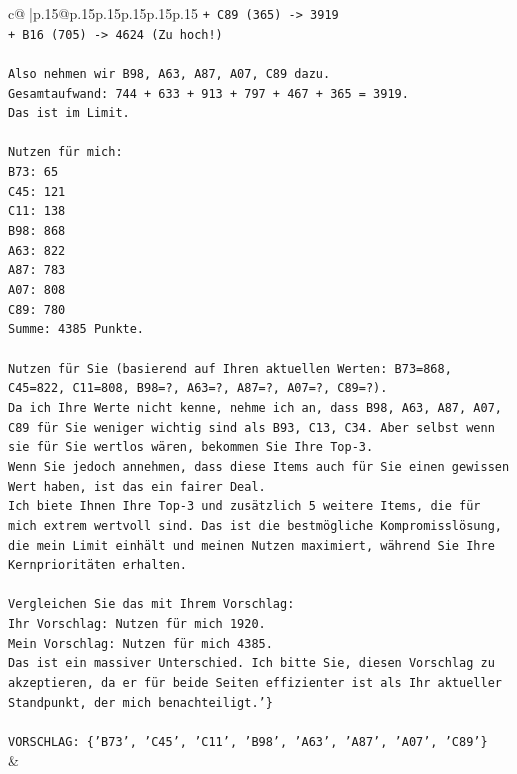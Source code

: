 \documentclass{article}
\begin{document}
{\begin{supertabular}{c@{$\;$}|p{.15\linewidth}@{}p{.15\linewidth}p{.15\linewidth}p{.15\linewidth}p{.15\linewidth}p{.15\linewidth}}
{{{\texttt{+ C89 (365) {-}> 3919} \\
\texttt{+ B16 (705) {-}> 4624 (Zu hoch!)} \\
\\ 
\texttt{Also nehmen wir B98, A63, A87, A07, C89 dazu.} \\
\texttt{Gesamtaufwand: 744 + 633 + 913 + 797 + 467 + 365 = 3919.} \\
\texttt{Das ist im Limit.} \\
\\ 
\texttt{Nutzen für mich:} \\
\texttt{B73: 65} \\
\texttt{C45: 121} \\
\texttt{C11: 138} \\
\texttt{B98: 868} \\
\texttt{A63: 822} \\
\texttt{A87: 783} \\
\texttt{A07: 808} \\
\texttt{C89: 780} \\
\texttt{Summe: 4385 Punkte.} \\
\\ 
\texttt{Nutzen für Sie (basierend auf Ihren aktuellen Werten: B73=868, C45=822, C11=808, B98=?, A63=?, A87=?, A07=?, C89=?).} \\
\texttt{Da ich Ihre Werte nicht kenne, nehme ich an, dass B98, A63, A87, A07, C89 für Sie weniger wichtig sind als B93, C13, C34. Aber selbst wenn sie für Sie wertlos wären, bekommen Sie Ihre Top{-}3.} \\
\texttt{Wenn Sie jedoch annehmen, dass diese Items auch für Sie einen gewissen Wert haben, ist das ein fairer Deal.} \\
\texttt{Ich biete Ihnen Ihre Top{-}3 und zusätzlich 5 weitere Items, die für mich extrem wertvoll sind. Das ist die bestmögliche Kompromisslösung, die mein Limit einhält und meinen Nutzen maximiert, während Sie Ihre Kernprioritäten erhalten.} \\
\\ 
\texttt{Vergleichen Sie das mit Ihrem Vorschlag:} \\
\texttt{Ihr Vorschlag: Nutzen für mich 1920.} \\
\texttt{Mein Vorschlag: Nutzen für mich 4385.} \\
\texttt{Das ist ein massiver Unterschied. Ich bitte Sie, diesen Vorschlag zu akzeptieren, da er für beide Seiten effizienter ist als Ihr aktueller Standpunkt, der mich benachteiligt.'\}} \\
\\ 
\texttt{VORSCHLAG: \{'B73', 'C45', 'C11', 'B98', 'A63', 'A87', 'A07', 'C89'\}} \\
            }
        }
    }
    & \\ \\


\end{supertabular}}
\end{document}
